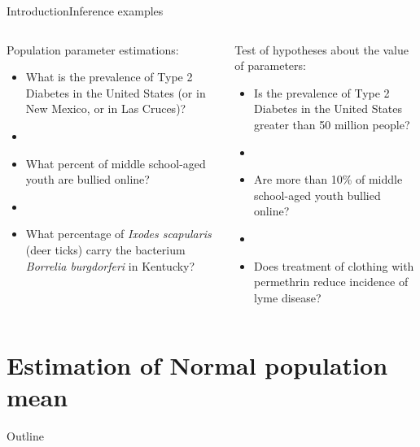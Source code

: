 \documentclass[xcolor=dvipsnames]{beamer}
\begin{document}
\begin{frame}{Introduction}{Inference examples}
	\begin{columns}
		\begin{column}{.5 \textwidth}
			Population parameter estimations:
			\begin{itemize}
				\item What is the prevalence of Type 2 Diabetes in the United States (or in New Mexico, or in Las Cruces)? \pause
				\item[]
				\item What percent of middle school-aged youth are bullied online? \pause
				\item[]
				\item What percentage of \emph{Ixodes scapularis} (deer ticks) carry the bacterium \emph{Borrelia burgdorferi} in Kentucky? \pause
			\end{itemize}
		\end{column}
	
		\begin{column}{.5 \textwidth}
			Test of hypotheses about the value of parameters:
			\begin{itemize}
				\item Is the prevalence of Type 2 Diabetes in the United States greater than 50 million people? \pause 
				\item[]
				\item Are more than 10\% of middle school-aged youth bullied online? \pause
				\item[]
				\item Does treatment of clothing with permethrin reduce incidence of lyme disease? 
			\end{itemize}
		\end{column}
	\end{columns}
\end{frame}

\section{Estimation of Normal population mean}
\begin{frame}{Outline}
	\tableofcontents[currentsection,subsectionstyle=show/shaded/hide]
\end{frame}
\end{document}

